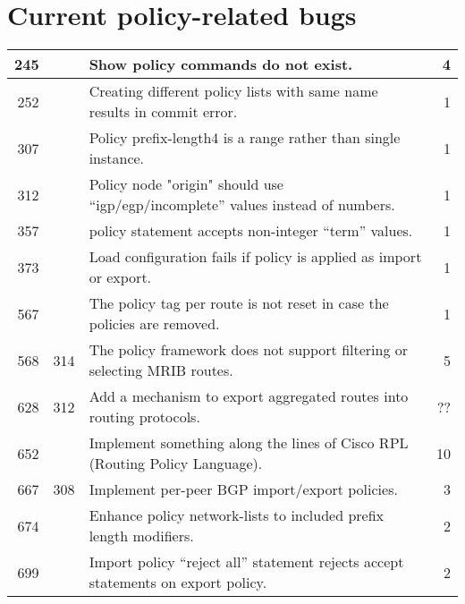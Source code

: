 \documentclass[letterpaper]{article}
\begin{document}
\section{Current policy-related bugs}
\begin{center}
\tabletail{
\hline
}
\begin{supertabular}{|r |r |p{10cm} |r|}
\hline

245 &  
& Show policy commands do not exist.
& 4 \\
\hline

252 &  
& Creating different policy lists with same name results in commit
error. 
& 1 \\
\hline

307 &  
& Policy prefix-length4 is a range rather than single instance.
& 1 \\
\hline

312 & 
& Policy node "origin" should use ``igp/egp/incomplete'' values instead of
numbers.
& 1 \\
\hline

357 & 
& policy statement accepts non-integer ``term'' values.
& 1 \\
\hline

373 & 
& Load configuration fails if policy is applied as import or export.
& 1 \\
\hline

567 & 
& The policy tag per route is not reset in case the policies are removed.
& 1 \\
\hline

568 & 314
& The policy framework does not support filtering or selecting MRIB routes.
& 5 \\
\hline

628 & 312
&   	Add a mechanism to export aggregated routes into routing protocols.
& ?? \\
\hline

652 & 
& Implement something along the lines of Cisco RPL (Routing Policy Language).
& 10 \\
\hline

667 & 308
& Implement per-peer BGP import/export policies.
& 3 \\
\hline

674 & 
& Enhance policy network-lists to included prefix length modifiers.
& 2 \\
\hline

699 & 
& Import policy ``reject all'' statement rejects accept statements on export
policy.
& 2 \\

\end{supertabular}
\end{center}
\end{document}
